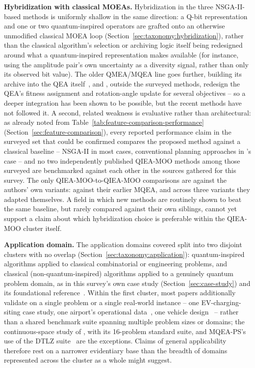 \textbf{Hybridization with classical MOEAs.} Hybridization in the
three NSGA-II-based methods is uniformly shallow in the same direction: a Q-bit
representation and one or two quantum-inspired operators are grafted
onto an otherwise unmodified classical MOEA loop
(Section~\ref{sec:taxonomy:hybridization}), rather than the classical
algorithm's selection or archiving logic itself being redesigned around
what a quantum-inspired representation makes available (for instance,
using the amplitude pair's own uncertainty as a diversity signal, rather
than only its observed bit value). The older QMEA/MQEA line goes
further, building its archive into the QEA
itself~\citep{kim2009mqea,kim2011mqeaps}, and
\citet{ho2013vectorqea}, outside the surveyed methods, redesign the
QEA's fitness assignment and rotation-angle update for several
objectives -- so a deeper integration has been shown to be possible,
but the recent methods have not followed it. A second, related weakness is
evaluative rather than architectural: as already noted from
Table~\ref{tab:feature-comparison-performance}
(Section~\ref{sec:feature-comparison}), every reported performance claim
in the surveyed set that could be confirmed compares the proposed method
against a classical baseline -- NSGA-II in most cases, conventional
planning approaches in \citet{kumar2026eahqnsga2}'s case -- and no two
independently published QIEA-MOO methods among those surveyed are
benchmarked against each other in the sources gathered for this survey.
The only QIEA-MOO-to-QIEA-MOO comparisons are against the authors' own
variants: \citet{kim2011mqeaps} against their earlier MQEA, and
\citet{olvera2023continuous} across three variants they adapted
themselves. A field in which new
methods are routinely shown to beat the same baseline, but rarely
compared against their own siblings, cannot yet support a claim about
which hybridization choice is preferable within the QIEA-MOO cluster
itself.

\textbf{Application domain.} The application domains covered split into
two disjoint clusters with no overlap
(Section~\ref{sec:taxonomy:application}): quantum-inspired algorithms
applied to classical combinatorial or engineering
problems, and
classical (non-quantum-inspired) algorithms applied to a genuinely
quantum problem domain, as in this survey's own case study
(Section~\ref{sec:case-study}) and its foundational
reference~\citep{ghlib2026scalable}. Within the first cluster, most
papers additionally validate on a single problem or a single real-world
instance -- one EV-charging-siting case study, one airport's
operational data~\citep{deng2020gate}, one vehicle
design~\citep{wang2014powertrain} -- rather than a shared benchmark
suite spanning multiple problem sizes or domains; the continuous-space
study of \citet{olvera2023continuous}, with its 16-problem standard
suite, and MQEA-PS's use of the DTLZ suite~\citep{kim2011mqeaps} are the
exceptions. Claims of general applicability therefore rest
on a narrower evidentiary base than the breadth of domains represented
across the cluster as a whole might suggest.

